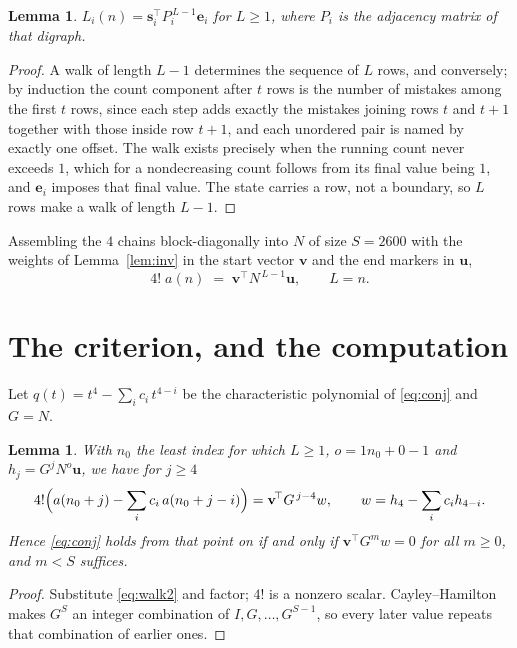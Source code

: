 \documentclass[11pt,a4paper]{article}
\theoremstyle{plain}
\newtheorem{lemma}[theorem]{Lemma}
\theoremstyle{definition}
\begin{document}
\begin{lemma}\label{lem:walk}
$L_i(n)=\mathbf{s}_i^{\!\top}P_i^{\,L-1}\mathbf{e}_i$ for $L\ge1$, where $P_i$ is the
adjacency matrix of that digraph.
\end{lemma}

\begin{proof}
A walk of length $L-1$ determines the sequence of $L$ rows, and conversely; by induction
the count component after $t$ rows is the number of mistakes among the first $t$ rows,
since each step adds exactly the mistakes joining rows $t$ and $t+1$ together with those
inside row $t+1$, and each unordered pair is named by exactly one offset. The walk exists
precisely when the running count never exceeds $1$, which for a nondecreasing count follows
from its final value being $1$, and $\mathbf{e}_i$ imposes that final value. The state
carries a row, not a boundary, so $L$ rows make a walk of length $L-1$.
\end{proof}

Assembling the $4$ chains block-diagonally into $N$ of size $S=2600$ with the weights of
Lemma~\ref{lem:inv} in the start vector $\mathbf{v}$ and the end markers in
$\mathbf{u}$,
\begin{equation}\label{eq:walk2}
4!\;a(n)\;=\;\mathbf{v}^{\!\top}N^{\,L-1}\mathbf{u},\qquad L=n .
\end{equation}

\section{The criterion, and the computation}

Let $q(t)=t^{4}-\sum_i c_i\,t^{4-i}$ be the characteristic polynomial of
\eqref{eq:conj} and $G=N$.

\begin{lemma}\label{lem:crit}
With $n_0$ the least index for which $L\ge1$, $o=1n_0+0-1$ and
$h_j=G^{j}N^{o}\mathbf{u}$, we have for $j\ge4$
\[
4!\Bigl(a(n_0+j)-\sum_i c_i\,a(n_0+j-i)\Bigr)=\mathbf{v}^{\!\top}G^{\,j-4}w,
\qquad w=h_{4}-\sum_i c_ih_{4-i} .
\]
Hence \eqref{eq:conj} holds from that point on if and only if
$\mathbf{v}^{\!\top}G^{m}w=0$ for all $m\ge0$, and $m<S$ suffices.
\end{lemma}

\begin{proof}
Substitute \eqref{eq:walk2} and factor; $4!$ is a nonzero scalar. Cayley--Hamilton
makes $G^{S}$ an integer combination of $I,G,\dots,G^{S-1}$, so every later value repeats
that combination of earlier ones.
\end{proof}
\end{document}
